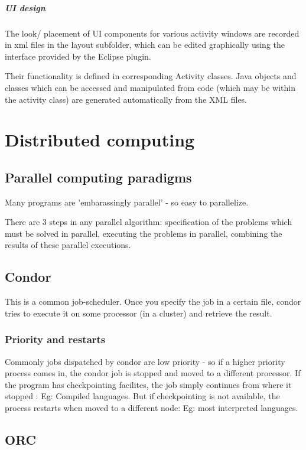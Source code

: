 \subsubsection{UI design}
The look/ placement of UI components for various activity windows are recorded in xml files in the layout subfolder, which can be edited graphically using the interface provided by the Eclipse plugin.

Their functionality is defined in corresponding Activity classes. Java objects and classes which can be accessed and manipulated from code (which may be within the activity class) are generated automatically from the XML files.

\part{Distributed computing}
\chapter{Parallel computing paradigms}
Many programs are 'embarassingly parallel' - so easy to parallelize.

There are 3 steps in any parallel algorithm: specification of the problems which must be solved in parallel, executing the problems in parallel, combining the results of these parallel executions.

\chapter{Condor}
This is a common job-scheduler. Once you specify the job in a certain file, condor tries to execute it on some processor (in a cluster) and retrieve the result.

\section{Priority and restarts}
Commonly jobs dispatched by condor are low priority - so if a higher priority process comes in, the condor job is stopped and moved to a different processor. If the program has checkpointing facilites, the job simply continues from where it stopped : Eg: Compiled languages. But if checkpointing is not available, the process restarts when moved to a different node: Eg: most interpreted languages.

\chapter{ORC}
